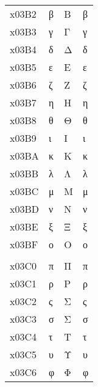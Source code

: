 \documentclass[a4paper]{article}
\newcommand*{\Greek}{\foreignlanguage{greek}}
\newcommand*{\Greek}{\ensuregreek}
\newcommand*{\Cases}[1]{%
  & \Greek{#1} & \Greek{\MakeUppercase{#1}} & \Greek{\MakeLowercase{#1}}
}
\begin{document}
\begin{longtable}{llll}
  x03B2 \Cases{ β  \beta{}                                                    } \\
  x03B3 \Cases{ γ  \gamma{}                                                   } \\
  x03B4 \Cases{ δ  \delta{}                                                   } \\
  x03B5 \Cases{ ε  \epsilon{}                                                 } \\
  x03B6 \Cases{ ζ  \zeta{}                                                    } \\
  x03B7 \Cases{ η  \eta{}                                                     } \\
  x03B8 \Cases{ θ  \theta{}                                                   } \\
  x03B9 \Cases{ ι  \iota{}                                                    } \\
  x03BA \Cases{ κ  \kappa{}                                                   } \\
  x03BB \Cases{ λ  \lambda{}                                                  } \\
  x03BC \Cases{ μ  \mu{}                                                      } \\
  x03BD \Cases{ ν  \nu{}                                                      } \\
  x03BE \Cases{ ξ  \xi{}                                                      } \\
  x03BF \Cases{ ο  \omicron{}                                                 } \\
                                                                                \\
  x03C0 \Cases{ π  \pi{}                                                      } \\
  x03C1 \Cases{ ρ  \rho{}                                                     } \\
  x03C2 \Cases{ ς  \finalsigma{}                 \varsigma{}                  } \\
  x03C3 \Cases{ σ  \sigma{}                                                   } \\
  x03C4 \Cases{ τ  \tau{}                                                     } \\
  x03C5 \Cases{ υ  \upsilon{}                                                 } \\
  x03C6 \Cases{ φ  \phi{}                                                     } \\

\end{longtable}
\end{document}
